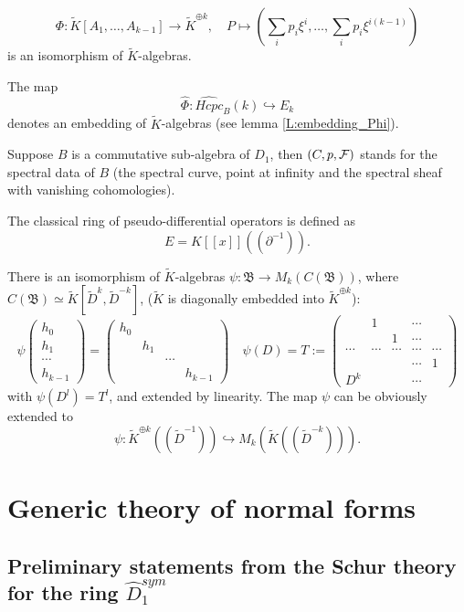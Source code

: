 \documentclass[11pt]{article}
\theoremstyle{definition}
\theoremstyle{plain}
\numberwithin{equation}{section}
\newcommand{\cf}{{{\cal F}}}
\begin{document}
	$$\Phi : \tilde{K}[A_1,\ldots ,A_{k-1}]\rightarrow \tilde{K}^{\oplus k} , \quad  { P\mapsto (\sum_i p_i\xi^{i}, \ldots , \sum_i p_i\xi^{i(k-1)})}
$$
is an isomorphism of $\tilde{K}$-algebras. 	

The map 
$$
\hat{\Phi}: \widehat{Hcpc}_B(k) \hookrightarrow E_k
$$
denotes an embedding of $\tilde{K}$-algebras (see lemma \ref{L:embedding_Phi}). 
	
	Suppose $B$ is a commutative sub-algebra of $D_1$, then $(C,p,\cf)$ stands for the spectral data of $B$ (the spectral curve, point at infinity and the spectral sheaf with vanishing cohomologies).
	
	The classical ring of pseudo-differential operators  is defined as
	$$
E=K[[x]]((\partial^{-1})).
	$$

There is an isomorphism of $\tilde{K}$-algebras $\psi:\mathfrak{B}\rightarrow M_k(C(\mathfrak{B}))$, where $C(\mathfrak{B})\simeq \tilde{K}[\tilde{D}^k, \tilde{D}^{-k}]$, ($\tilde{K}$ is diagonally embedded into $\tilde{K}^{\oplus k}$):
	$$
	\psi\begin{pmatrix}
		h_0 \\
		h_1 \\
		\cdots \\
		h_{k-1}
	\end{pmatrix}=\begin{pmatrix}
		h_0 &  &  &  \\
		& h_1 &  &  \\
		&  & \cdots &  \\
		&  &  & h_{k-1}
	\end{pmatrix}\quad \psi(D)=T:=\begin{pmatrix}
		& 1 &  & \cdots &  \\
		&  & 1 & \cdots &  \\
		\cdots & \cdots & \cdots & \cdots & \cdots \\
		&  &  & \cdots & 1 \\
		D^k &  &  & \cdots & 
	\end{pmatrix}
	$$
	with $\psi(D^l)=T^l$, and extended by linearity. The map $\psi$ can be obviously extended to 
	$$
\psi : \tilde{K}^{\oplus k}((\tilde{D}^{-1})) \hookrightarrow M_k(\tilde{K}((\tilde{D}^{-k}))).
	$$


\section{Generic theory of normal forms}
\label{S:generic_normal_forms}

\subsection{Preliminary statements from the Schur theory for the ring $\hat{D}_1^{sym}$}
\label{S:Schur theory for the ring}
\end{document}
